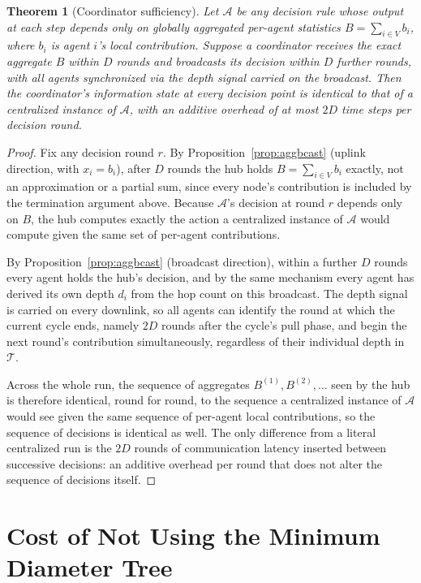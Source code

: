\documentclass[letterpaper]{article} %
\newtheorem{theorem}{Theorem}
\begin{document}
\begin{theorem}[Coordinator sufficiency]
\label{thm:coordinator}
Let $\mathcal{A}$ be any decision rule whose output at each step depends
only on globally aggregated per-agent statistics $B = \sum_{i \in V} b_i$,
where $b_i$ is agent $i$'s local contribution. Suppose a coordinator
receives the exact aggregate $B$ within $D$ rounds and broadcasts its
decision within $D$ further rounds, with all agents synchronized via the
depth signal carried on the broadcast. Then the coordinator's information
state at every decision point is identical to that of a centralized
instance of $\mathcal{A}$, with an additive overhead of at most $2D$ time
steps per decision round.
\end{theorem}

\begin{proof}
Fix any decision round $r$. By Proposition~\ref{prop:aggbcast} (uplink
direction, with $x_i = b_i$), after $D$ rounds the hub holds $B =
\sum_{i\in V} b_i$ exactly, not an approximation or a partial sum, since
every node's contribution is included by the termination argument above.
Because $\mathcal{A}$'s decision at round $r$ depends only on $B$, the hub
computes exactly the action a centralized instance of $\mathcal{A}$ would
compute given the same set of per-agent contributions.

By Proposition~\ref{prop:aggbcast} (broadcast direction), within a further
$D$ rounds every agent holds the hub's decision, and by the same mechanism
every agent has derived its own depth $d_i$ from the hop count on this
broadcast. The depth signal is carried on every downlink, so all agents can
identify the round at which the current cycle ends, namely $2D$ rounds
after the cycle's pull phase, and begin the next round's contribution
simultaneously, regardless of their individual depth in $\mathcal{T}$.

Across the whole run, the sequence of aggregates $B^{(1)}, B^{(2)},
\ldots$ seen by the hub is therefore identical, round for round, to the
sequence a centralized instance of $\mathcal{A}$ would see given the same
sequence of per-agent local contributions, so the sequence of decisions is
identical as well. The only difference from a literal centralized run is
the $2D$ rounds of communication latency inserted between successive
decisions: an additive overhead per round that does not alter the sequence
of decisions itself.
\end{proof}

\section{Cost of Not Using the Minimum Diameter Tree}
\label{sec:mdst-gap}
\end{document}
